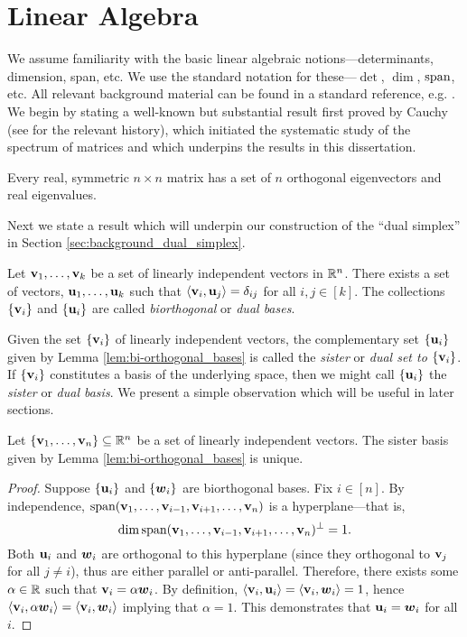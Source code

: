 \section{Linear Algebra}
\label{sec:background_linear} 
We assume familiarity with the basic linear algebraic notions---determinants, dimension, span, etc. We use the standard notation for these---$\det$, $\dim$, $\textnormal{span}$, etc. All relevant background material can be found in a standard reference, e.g. \cite{axler1997linear}. 
We begin by stating a well-known but substantial result first proved by Cauchy (see \cite{hawkins1975cauchy} for the relevant history), which initiated the systematic study of the spectrum of matrices and which underpins the results in this dissertation. 

\begin{theorem}
	\label{thm:spectral_theorem}
	Every real, symmetric $n\times n$ matrix has a set of $n$ orthogonal eigenvectors and real eigenvalues.  
\end{theorem}

Next we state a result which will underpin our construction of the ``dual simplex'' in Section \ref{sec:background_dual_simplex}. 

\begin{lemma}
\label{lem:bi-orthogonal_bases}
Let $\vb{v}_1,\dots,\vb{v}_k$ be a set of linearly independent vectors in $\mathbb{R}^n$. There exists a set of vectors, $\vb{u}_1,\dots,\vb{u}_k$ such that $\langle \vb{v}_i,\vb{u}_j\rangle = \delta_{ij}$ for all $i,j\in[k]$. The collections $\{\vb{v}_i\}$ and $\{\vb{u}_i\}$ are called \emph{biorthogonal} or \emph{dual bases}.  
\end{lemma}

Given the set $\{\vb{v}_i\}$ of linearly independent vectors, the complementary set $\{\vb{u}_i\}$ given by Lemma \ref{lem:bi-orthogonal_bases} is called the \emph{sister} or \emph{dual set to $\{\vb{v}_i\}$}. If $\{\vb{v}_i\}$ constitutes a basis of the underlying space, then we might call $\{\vb{u}_i\}$ the \emph{sister} or \emph{dual basis}.  We present a simple observation which will be useful in later sections. 

\begin{observation}
\label{obs:bi-orthogonal_unique}
Let $\{\vb{v}_1,\dots,\vb{v}_n\}\subseteq\mathbb{R}^n$ be a set of linearly independent vectors. The sister basis given by Lemma \ref{lem:bi-orthogonal_bases} is unique. 
\end{observation}
\begin{proof}
Suppose $\{\vb{u}_i\}$ and $\{\vb*{w}_i\}$ are biorthogonal bases. Fix $i\in[n]$. By independence, $\textnormal{span}(\vb{v}_1,\dots,\\\vb{v}_{i-1},\vb{v}_{i+1},\dots,\vb{v}_n)$ is a hyperplane---that is, \[\dim\textnormal{span}(\vb{v}_1,\dots,\vb{v}_{i-1},\vb{v}_{i+1},\dots,\vb{v}_n)^\perp=1.\] Both $\vb{u}_i$ and $\vb*{w}_i$ are orthogonal to this hyperplane (since they orthogonal to $\vb{v}_j$ for all $j\neq i$), thus are either parallel or anti-parallel. Therefore, there exists some $\alpha\in\mathbb{R}$ such that $\vb{v}_i=\alpha\vb*{w}_i$. By definition, $\langle \vb{v}_i,\vb{u}_i\rangle = \langle \vb{v}_i,\vb*{w}_i\rangle =1$, hence $\langle \vb{v}_i,\alpha \vb*{w}_i\rangle = \langle \vb{v}_i,\vb*{w}_i\rangle$ implying that $\alpha=1$. This demonstrates that $\vb{u}_i=\vb*{w}_i$ for all $i$. 
\end{proof}

